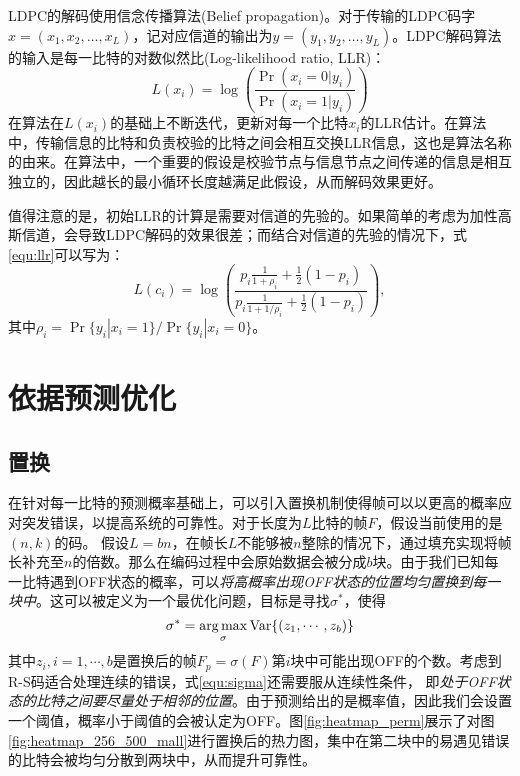 LDPC的解码使用信念传播算法(Belief propagation)。对于传输的LDPC码字$x = (x_1, x_2, …, x_{L})$，记对应信道的输出为$y = (y_1, y_2, …, y_{L})$。LDPC解码算法的输入是每一比特的对数似然比(Log-likelihood ratio, LLR)：
\begin{equation}
\label{equ:llr}
L(x_i)=\log\left(\frac{\Pr(x_i=0|y_i)}{\Pr(x_i=1|y_i)}\right)
\end{equation}
在算法在$L(x_i)$的基础上不断迭代，更新对每一个比特$x_i$的LLR估计。在算法中，传输信息的比特和负责校验的比特之间会相互交换LLR信息，这也是算法名称的由来。在算法中，一个重要的假设是校验节点与信息节点之间传递的信息是相互独立的，因此越长的最小循环长度越满足此假设，从而解码效果更好。

值得注意的是，初始LLR的计算是需要对信道的先验的。如果简单的考虑为加性高斯信道，会导致LDPC解码的效果很差；而结合对信道的先验的情况下，式\ref{equ:llr}可以写为：
\begin{equation}
\label{equ:llr_new}
L(c_i)=\log\left(\frac{ p_i \frac{1}{1+\rho_i} + \frac{1}{2} (1-p_i) }{ p_i \frac{1}{1+1/\rho_i} + \frac{1}{2} (1-p_i)  }\right),
\end{equation}
其中$\rho_i = \Pr\{y_i|x_i=1\}/\Pr\{y_i|x_i=0\}$。
\section{依据预测优化}

\subsection{置换}
\label{subsec:perm}
在针对每一比特的预测概率基础上，可以引入置换机制使得帧可以以更高的概率应对突发错误，以提高系统的可靠性。对于长度为$L$比特的帧$F$，假设当前使用的是$(n,k)$的码。
假设$L = bn$，在帧长$L$不能够被$n$整除的情况下，通过填充实现将帧长补充至$n$的倍数。那么在编码过程中会原始数据会被分成$b$块。由于我们已知每一比特遇到OFF状态的概率，可以\emph{将高概率出现OFF状态的位置均匀置换到每一块中}。这可以被定义为一个最优化问题，目标是寻找$\sigma^\ast$，使得
\begin{equation}
\label{equ:sigma}
\sigma^\ast = \operatorname*{arg\,max}_\sigma \mathrm{Var} \{ (z_1, \cdots, z_b) \} 
\end{equation}
其中$z_i, i = 1,\cdots,b$是置换后的帧$F_p = \sigma(F)$第$i$块中可能出现OFF的个数。考虑到R-S码适合处理连续的错误，式\ref{equ:sigma}还需要服从连续性条件，
即\emph{处于OFF状态的比特之间要尽量处于相邻的位置}。由于预测给出的是概率值，因此我们会设置一个阈值，概率小于阈值的会被认定为OFF。图\ref{fig:heatmap_perm}展示了对图\ref{fig:heatmap_256_500_mall}进行置换后的热力图，集中在第二块中的易遇见错误的比特会被均匀分散到两块中，从而提升可靠性。

